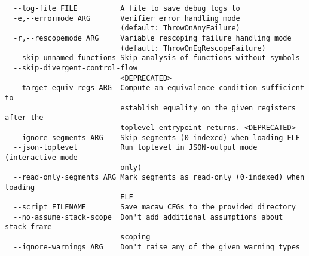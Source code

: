 \begin{verbatim}
  --log-file FILE          A file to save debug logs to
  -e,--errormode ARG       Verifier error handling mode
                           (default: ThrowOnAnyFailure)
  -r,--rescopemode ARG     Variable rescoping failure handling mode
                           (default: ThrowOnEqRescopeFailure)
  --skip-unnamed-functions Skip analysis of functions without symbols
  --skip-divergent-control-flow
                           <DEPRECATED>
  --target-equiv-regs ARG  Compute an equivalence condition sufficient to
                           establish equality on the given registers after the
                           toplevel entrypoint returns. <DEPRECATED>
  --ignore-segments ARG    Skip segments (0-indexed) when loading ELF
  --json-toplevel          Run toplevel in JSON-output mode (interactive mode
                           only)
  --read-only-segments ARG Mark segments as read-only (0-indexed) when loading
                           ELF
  --script FILENAME        Save macaw CFGs to the provided directory
  --no-assume-stack-scope  Don't add additional assumptions about stack frame
                           scoping
  --ignore-warnings ARG    Don't raise any of the given warning types
\end{verbatim}


